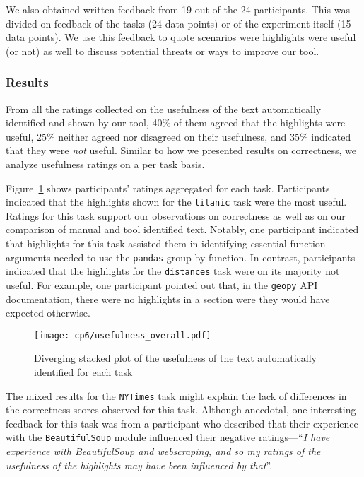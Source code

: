 We also obtained written feedback from 19 out of the 24 participants. This was divided on feedback of the tasks (24 data points)
or of the experiment itself (15 data points). We use this feedback to quote scenarios were highlights were useful (or not)
as well to discuss potential threats or ways to improve our tool.



\subsubsection{Results}


From all the ratings collected on the  usefulness of the text automatically identified and shown by our tool, 40\% of them agreed that the highlights were useful, 
25\% neither agreed nor disagreed on their usefulness, and 35\% indicated that they were \textit{not} useful.
Similar to how we presented results on correctness, we analyze usefulness ratings on a per task basis.  




Figure~\ref{fig:usefulness-by-task} shows participants' ratings aggregated for each task. 
Participants indicated that the highlights shown for the \texttt{titanic} task were the most useful. 
Ratings for this task support our observations on correctness as well as on our comparison of manual and tool identified text. 
Notably, one participant indicated that highlights for this task assisted them in identifying essential function arguments needed to use the \texttt{pandas} group by function.
In contrast, participants indicated that the highlights for the \texttt{distances} task were on its majority not useful. 
For example, one participant pointed out that, in the \texttt{geopy} API documentation, there were no highlights in 
a section were they would have expected otherwise.


\begin{figure}
    \centering
    \texttt{[image: cp6/usefulness\_overall.pdf]}
    \caption{Diverging stacked plot of the usefulness of the text automatically identified for each task}
    \label{fig:usefulness-by-task}
\end{figure}


The mixed results for the \texttt{NYTimes} task might explain the lack of differences in the correctness scores observed for this task. 
Although anecdotal, one interesting feedback for this task was from a participant who described that 
their experience with the \texttt{BeautifulSoup} module influenced their negative ratings---``\textit{I have experience with BeautifulSoup and webscraping, and so my ratings of the usefulness of the highlights may have been influenced by that}''.








